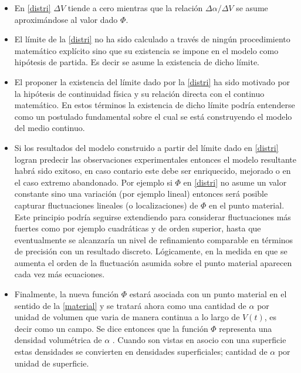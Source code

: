 \documentclass[../notas medios.tex]{subfiles}
\begin{document}
\begin{itemize}
\item En \cref{distri} $\Delta V$ tiende a cero mientras que la relación $\Delta \alpha /\Delta V$ se asume aproximándose al valor dado $\Phi$.

\item El límite de la \cref{distri} no ha sido calculado a través de ningún
procedimiento matemático explícito sino que su existencia se impone en el modelo como hipótesis de partida.  Es decir se asume la existencia de dicho límite.

\item El proponer la existencia del límite dado por la \cref{distri} ha sido
motivado por la hipótesis de continuidad física y su relación directa con el continuo matemático. En estos términos la existencia de dicho límite podría entenderse como un postulado fundamental sobre el cual se está construyendo el modelo del medio continuo. 

\item Si los resultados del modelo construido a partir del límite dado en
\cref{distri} logran predecir las observaciones experimentales entonces el modelo resultante habrá sido exitoso, en caso contario este debe ser enriquecido, mejorado o en el caso extremo abandonado.  Por ejemplo si $\Phi$ en \cref{distri} no asume un valor constante sino una variación (por ejemplo lineal) entonces será posible capturar fluctuaciones lineales (o localizaciones) de $\Phi$ en el punto material.  Este principio podría seguirse extendiendo para considerar fluctuaciones más fuertes como por ejemplo cuadráticas y de orden superior, hasta que eventualmente se alcanzaría un nivel de refinamiento comparable en términos de precisión con un resultado discreto.  Lógicamente, en la medida en que se aumenta el orden de la fluctuación asumida sobre el punto material aparecen cada vez más ecuaciones.

\item Finalmente, la nueva función $\Phi$ estará asociada con un punto material en el sentido de la \cref{material} y se tratará ahora como una cantidad de $\alpha$ por unidad de volumen que varia de manera continua a lo largo de $V(t)$, es decir como un campo.  Se dice entonces que la función $\Phi$ representa una densidad volumétrica de $\alpha$ .  Cuando son vistas en asocio con una superficie estas densidades se convierten en densidades superficiales; cantidad de $\alpha$ por unidad de superficie.

\end{itemize}
\end{document}
